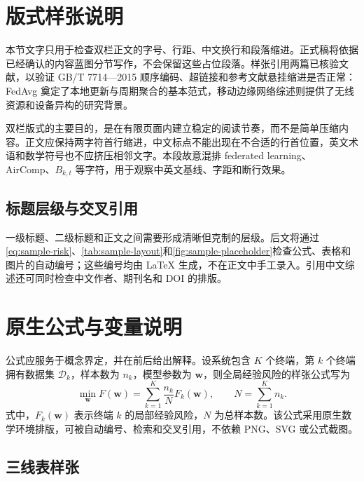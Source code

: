\section{版式样张说明}\label{sec:sample-intro}

本节文字只用于检查双栏正文的字号、行距、中文换行和段落缩进。正式稿将依据已经确认的内容蓝图分节写作，不会保留这些占位段落。样张引用两篇已核验文献，以验证 GB/T 7714—2015 顺序编码、超链接和参考文献悬挂缩进是否正常：FedAvg 奠定了本地更新与周期聚合的基本范式\cite{McMahan2017FedAvg}，移动边缘网络综述则提供了无线资源和设备异构的研究背景\cite{Lim2020MobileEdge}。

双栏版式的主要目的，是在有限页面内建立稳定的阅读节奏，而不是简单压缩内容。正文应保持两字符首行缩进，中文标点不能出现在不合适的行首位置，英文术语和数学符号也不应挤压相邻文字。本段故意混排 federated learning、AirComp、\(B_{k,t}\) 等字符，用于观察中英文基线、字距和断行效果。

\subsection{标题层级与交叉引用}\label{subsec:sample-crossref}

一级标题、二级标题和正文之间需要形成清晰但克制的层级。后文将通过\cref{eq:sample-risk}、\cref{tab:sample-layout}和\cref{fig:sample-placeholder}检查公式、表格和图片的自动编号；这些编号均由 LaTeX 生成，不在正文中手工录入。引用中文综述\cite{Zhang2023EdgeFLSurvey}还可同时检查中文作者、期刊名和 DOI 的排版。

\section{原生公式与变量说明}\label{sec:sample-equation}

公式应服务于概念界定，并在前后给出解释。设系统包含 \(K\) 个终端，第 \(k\) 个终端拥有数据集 \(\mathcal D_k\)，样本数为 \(n_k\)，模型参数为 \(\bm w\)，则全局经验风险的样张公式写为
\begin{equation}\label{eq:sample-risk}
  \min_{\bm w} F(\bm w)
  = \sum_{k=1}^{K} \frac{n_k}{N} F_k(\bm w),
  \qquad N=\sum_{k=1}^{K}n_k .
\end{equation}
式中，\(F_k(\bm w)\) 表示终端 \(k\) 的局部经验风险，\(N\) 为总样本数。该公式采用原生数学环境排版，可被自动编号、检索和交叉引用，不依赖 PNG、SVG 或公式截图。

\subsection{三线表样张}\label{subsec:sample-table}

